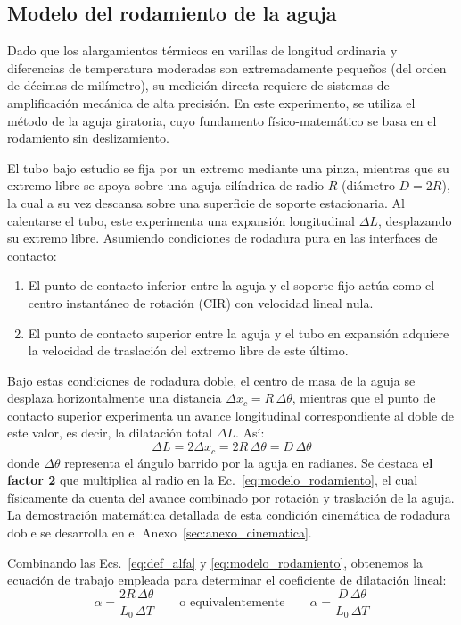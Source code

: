 \subsection{Modelo del rodamiento de la aguja}

Dado que los alargamientos térmicos en varillas de longitud ordinaria y diferencias de temperatura moderadas son extremadamente pequeños (del orden de décimas de milímetro), su medición directa requiere de sistemas de amplificación mecánica de alta precisión. En este experimento, se utiliza el método de la aguja giratoria, cuyo fundamento físico-matemático se basa en el rodamiento sin deslizamiento.

El tubo bajo estudio se fija por un extremo mediante una pinza, mientras que su extremo libre se apoya sobre una aguja cilíndrica de radio $R$ (diámetro $D = 2R$), la cual a su vez descansa sobre una superficie de soporte estacionaria. Al calentarse el tubo, este experimenta una expansión longitudinal $\Delta L$, desplazando su extremo libre. Asumiendo condiciones de rodadura pura en las interfaces de contacto:
\begin{enumerate}
    \item El punto de contacto inferior entre la aguja y el soporte fijo actúa como el centro instantáneo de rotación (CIR) con velocidad lineal nula.
    \item El punto de contacto superior entre la aguja y el tubo en expansión adquiere la velocidad de traslación del extremo libre de este último.
\end{enumerate}
Bajo estas condiciones de rodadura doble, el centro de masa de la aguja se desplaza horizontalmente una distancia $\Delta x_c = R\,\Delta\theta$, mientras que el punto de contacto superior experimenta un avance longitudinal correspondiente al doble de este valor, es decir, la dilatación total $\Delta L$. Así:
\begin{equation}
    \Delta L = 2\Delta x_c = 2R\,\Delta\theta = D\,\Delta\theta
    \label{eq:modelo_rodamiento}
\end{equation}
donde $\Delta\theta$ representa el ángulo barrido por la aguja en radianes. Se destaca \textbf{el factor 2} que multiplica al radio en la Ec.~\eqref{eq:modelo_rodamiento}, el cual físicamente da cuenta del avance combinado por rotación y traslación de la aguja. La demostración matemática detallada de esta condición cinemática de rodadura doble se desarrolla en el Anexo~\ref{sec:anexo_cinematica}.

Combinando las Ecs.~\eqref{eq:def_alfa} y \eqref{eq:modelo_rodamiento}, obtenemos la ecuación de trabajo empleada para determinar el coeficiente de dilatación lineal:
\begin{equation}
    \alpha = \frac{2R\,\Delta\theta}{L_0\,\Delta T} \qquad\text{o equivalentemente}\qquad \alpha = \frac{D\,\Delta\theta}{L_0\,\Delta T}
    \label{eq:formula_trabajo}
\end{equation}

